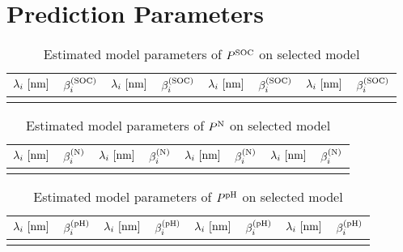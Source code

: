 \section{Prediction Parameters}
\label{sec:parameters}
	
	\begin{table}[ht]
		\center
		\caption{Estimated model parameters of $P^{\mathrm{SOC}}$ on selected model}
		\setlength{\extrarowheight}{4pt}
		\begin{tabular}{rr|rr|rr|rr}
			\hline
			$\lambda_i \ [\m{nm}]$ & $\beta^{\mathrm{(SOC)}}_i$ & $\lambda_i \ [\m{nm}]$ & $\beta^{\mathrm{(SOC)}}_i$ & $\lambda_i \ [\m{nm}]$ & $\beta^{\mathrm{(SOC)}}_i$ & $\lambda_i \ [\m{nm}]$ & $\beta^{\mathrm{(SOC)}}_i$ \\
			\hline
			\hline
			
			\hline \\
		\end{tabular}
	\end{table}

	\begin{table}[H]
		\center
		\caption{Estimated model parameters of $P^{\mathrm{N}}$ on selected model}
		\setlength{\extrarowheight}{2.2pt}
		\begin{tabular}{rr|rr|rr|rr}
			\hline
			$\lambda_i \ [\m{nm}]$ & $\beta^{\mathrm{(N)}}_i$ & $\lambda_i \ [\m{nm}]$ & $\beta^{\mathrm{(N)}}_i$ & $\lambda_i \ [\m{nm}]$ & $\beta^{\mathrm{(N)}}_i$ & $\lambda_i \ [\m{nm}]$ & $\beta^{\mathrm{(N)}}_i$ \\
			\hline
			\hline
			
			\hline \\
		\end{tabular}
	\end{table}

	\begin{table}[H]
		\center
		\caption{Estimated model parameters of $P^{\mathrm{pH}}$ on selected model}
		\setlength{\extrarowheight}{2.2pt}
		\begin{tabular}{rr|rr|rr|rr}
			\hline
			$\lambda_i \ [\m{nm}]$ & $\beta^{\mathrm{(pH)}}_i$ & $\lambda_i \ [\m{nm}]$ & $\beta^{\mathrm{(pH)}}_i$ & $\lambda_i \ [\m{nm}]$ & $\beta^{\mathrm{(pH)}}_i$ & $\lambda_i \ [\m{nm}]$ & $\beta^{\mathrm{(pH)}}_i$ \\
			\hline
			\hline
			
			\hline \\
		\end{tabular}
	\end{table}

